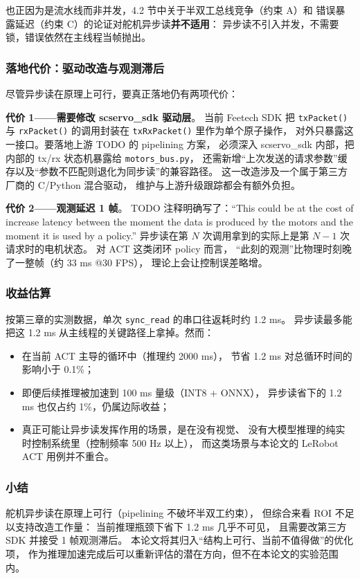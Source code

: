 也正因为是流水线而非并发，4.2 节中关于半双工总线竞争（约束 A）和
错误暴露延迟（约束 C）的论证对舵机异步读\textbf{并不适用}：
异步读不引入并发，不需要锁，错误依然在主线程当帧抛出。

\subsubsection{落地代价：驱动改造与观测滞后}\label{sec:async-read-cost}

尽管异步读在原理上可行，要真正落地仍有两项代价：

\textbf{代价 1——需要修改 scservo\_sdk 驱动层}。
当前 Feetech SDK 把 \texttt{txPacket()} 与 \texttt{rxPacket()}
的调用封装在 \texttt{txRxPacket()} 里作为单个原子操作，
对外只暴露这一接口。要落地上游 TODO 的 pipelining 方案，
必须深入 scservo\_sdk 内部，把内部的 tx/rx 状态机暴露给 \texttt{motors\_bus.py}，
还需新增``上次发送的请求参数''缓存以及``参数不匹配则退化为同步读''的兼容路径。
这一改造涉及一个属于第三方厂商的 C/Python 混合驱动，
维护与上游升级跟踪都会有额外负担。

\textbf{代价 2——观测延迟 1 帧}。
TODO 注释明确写了：``This could be at the cost of increase latency between
the moment the data is produced by the motors and the moment it is used by a policy.''
异步读在第 $N$ 次调用拿到的实际上是第 $N-1$ 次请求时的电机状态。
对 ACT 这类闭环 policy 而言，
``此刻的观测''比物理时刻晚了一整帧（约 33 ms @30 FPS），
理论上会让控制误差略增。

\subsubsection{收益估算}\label{sec:async-read-roi}

按第三章的实测数据，单次 \texttt{sync\_read} 的串口往返耗时约 1.2 ms。
异步读最多能把这 1.2 ms 从主线程的关键路径上拿掉。然而：
\begin{itemize}[leftmargin=2em]
  \item 在当前 ACT 主导的循环中（推理约 2000 ms），
        节省 1.2 ms 对总循环时间的影响小于 0.1\%；
  \item 即便后续推理被加速到 100 ms 量级（INT8 + ONNX），
        异步读省下的 1.2 ms 也仅占约 1\%，仍属边际收益；
  \item 真正可能让异步读发挥作用的场景，是在没有视觉、
        没有大模型推理的纯实时控制系统里（控制频率 500 Hz 以上），
        而这类场景与本论文的 LeRobot ACT 用例并不重合。
\end{itemize}

\subsubsection{小结}\label{sec:async-read-conclusion}

舵机异步读在原理上可行（pipelining 不破坏半双工约束），
但综合来看 ROI 不足以支持改造工作量：
当前推理瓶颈下省下 1.2 ms 几乎不可见，
且需要改第三方 SDK 并接受 1 帧观测滞后。
本论文将其归入``结构上可行、当前不值得做''的优化项，
作为推理加速完成后可以重新评估的潜在方向，但不在本论文的实验范围内。
